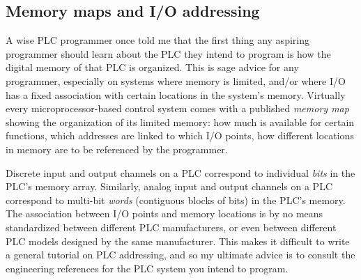 















\filbreak
\subsection{Memory maps and I/O addressing}

A wise PLC programmer once told me that the first thing any aspiring programmer should learn about the PLC they intend to program is how the digital memory of that PLC is organized.  This is sage advice for any programmer, especially on systems where memory is limited, and/or where I/O has a fixed association with certain locations in the system's memory.  Virtually every microprocessor-based control system comes with a published \textit{memory map} showing the organization of its limited memory: how much is available for certain functions, which addresses are linked to which I/O points, how different locations in memory are to be referenced by the programmer.

Discrete input and output channels on a PLC correspond to individual \textit{bits} in the PLC's memory array.  Similarly, analog input and output channels on a PLC correspond to multi-bit \textit{words} (contiguous blocks of bits) in the PLC's memory.  The association between I/O points and memory locations is by no means standardized between different PLC manufacturers, or even between different PLC models designed by the same manufacturer.  This makes it difficult to write a general tutorial on PLC addressing, and so my ultimate advice is to consult the engineering references for the PLC system you intend to program.  

